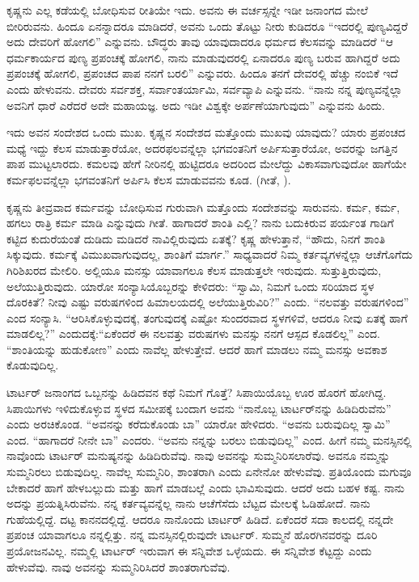 ಕೃಷ್ಣನು ಎಲ್ಲ ಕಡೆಯಲ್ಲಿ ಬೋಧಿಸುವ ರೀತಿಯೇ ಇದು. ಅವನು ಈ ವರ್ಚಸ್ಸನ್ನೇ ಇಡೀ ಜನಾಂಗದ ಮೇಲೆ ಬೀರಿರುವನು. ಹಿಂದೂ ಏನನ್ನಾದರೂ ಮಾಡಿದರೆ, ಅವನು ಒಂದು ತೊಟ್ಟು ನೀರು ಕುಡಿದರೂ “ಇದರಲ್ಲಿ ಪುಣ್ಯವಿದ್ದರೆ ಅದು ದೇವರಿಗೆ ಹೋಗಲಿ” ಎನ್ನುವನು. ಬೌದ್ಧರು ತಾವು ಯಾವುದಾದರೂ ಧರ್ಮದ ಕೆಲಸವನ್ನು ಮಾಡಿದರೆ “ಆ ಧರ್ಮಕಾರ್ಯದ ಪುಣ್ಯ ಪ್ರಪಂಚಕ್ಕೆ ಹೋಗಲಿ, ನಾನು ಮಾಡುವುದರಲ್ಲಿ ಏನಾದರೂ ಪುಣ್ಯ ಬರುವ ಹಾಗಿದ್ದರೆ ಅದು ಪ್ರಪಂಚಕ್ಕೆ ಹೋಗಲಿ, ಪ್ರಪಂಚದ ಪಾಪ ನನಗೆ ಬರಲಿ” ಎನ್ನುವರು. ಹಿಂದೂ ತನಗೆ ದೇವರಲ್ಲಿ ಹೆಚ್ಚು ನಂಬಿಕೆ ಇದೆ ಎಂದು ಹೇಳುವನು. ದೇವರು ಸರ್ವಶಕ್ತ, ಸರ್ವಾಂತರ್ಯಾಮಿ, ಸರ್ವವ್ಯಾಪಿ ಎನ್ನುವನು. “ನಾನು ನನ್ನ ಪುಣ್ಯವನ್ನೆಲ್ಲಾ ಅವನಿಗೆ ಧಾರೆ ಎರೆದರೆ ಅದೇ ಮಹಾಯಜ್ಞ. ಅದು ಇಡೀ ವಿಶ್ವಕ್ಕೇ ಅರ್ಪಣೆಯಾಗುವುದು” ಎನ್ನುವನು ಹಿಂದು.

ಇದು ಅವನ ಸಂದೇಶದ ಒಂದು ಮುಖ. ಕೃಷ್ಣನ ಸಂದೇಶದ ಮತ್ತೊಂದು ಮುಖವು ಯಾವುದು? ಯಾರು ಪ್ರಪಂಚದ ಮಧ್ಯೆ ಇದ್ದು ಕೆಲಸ ಮಾಡುತ್ತಾರೆಯೋ, ಅದರ\break ಫಲವನ್ನೆಲ್ಲಾ ಭಗವಂತನಿಗೆ ಅರ್ಪಿಸುತ್ತಾರೆಯೋ, ಅವರನ್ನು ಜಗತ್ತಿನ ಪಾಪ ಮುಟ್ಟಲಾರದು. ಕಮಲವು ಹೇಗೆ ನೀರಿನಲ್ಲಿ ಹುಟ್ಟಿದರೂ ಅದರಿಂದ ಮೇಲೆದ್ದು ವಿಕಾಸವಾಗುವುದೋ ಹಾಗೆಯೇ ಕರ್ಮಫಲವನ್ನೆಲ್ಲಾ ಭಗವಂತನಿಗೆ ಅರ್ಪಿಸಿ ಕೆಲಸ ಮಾಡುವವನು ಕೂಡ. (ಗೀತೆ, ).

ಕೃಷ್ಣನು ತೀವ್ರವಾದ ಕರ್ಮವನ್ನು ಬೋಧಿಸುವ ಗುರುವಾಗಿ ಮತ್ತೊಂದು ಸಂದೇಶವನ್ನು ಸಾರುವನು. ಕರ್ಮ, ಕರ್ಮ, ಹಗಲು ರಾತ್ರಿ ಕರ್ಮ ಮಾಡಿ ಎನ್ನುವುದು ಗೀತೆ. ಹಾಗಾದರೆ ಶಾಂತಿ ಎಲ್ಲಿ? ನಾನು ಬದುಕಿರುವ ಪರ್ಯಂತ ಗಾಡಿಗೆ ಕಟ್ಟಿದ ಕುದುರೆಯಂತೆ ದುಡಿದು ಮಡಿದರೆ ನಾವಿಲ್ಲಿರುವುದು ಏತಕ್ಕೆ? ಕೃಷ್ಣ ಹೇಳುತ್ತಾನೆ, “ಹೌದು, ನಿನಗೆ ಶಾಂತಿ ಸಿಕ್ಕುವುದು. ಕರ್ಮಕ್ಕೆ ವಿಮುಖವಾಗುವುದಲ್ಲ, ಶಾಂತಿಗೆ ಮಾರ್ಗ.” ಸಾಧ್ಯವಾದರೆ ನಿಮ್ಮ ಕರ್ತವ್ಯಗಳನ್ನೆಲ್ಲಾ ಆಚೆಗೊಗೆದು ಗಿರಿಶಿಖರದ ಮೇಲಿರಿ. ಅಲ್ಲಿಯೂ ಮನಸ್ಸು ಯಾವಾಗಲೂ ಕೆಲಸ ಮಾಡುತ್ತಲೇ ಇರುವುದು. ಸುತ್ತುತ್ತಿರುವುದು, ಅಲೆಯುತ್ತಿರುವುದು. ಯಾರೋ ಸಂನ್ಯಾಸಿಯೊಬ್ಬರನ್ನು ಕೇಳಿದರು: “ಸ್ವಾಮಿ, ನಿಮಗೆ ಒಂದು ಸರಿಯಾದ ಸ್ಥಳ ದೊರಕಿತೆ? ನೀವು ಎಷ್ಟು ವರುಷಗಳಿಂದ ಹಿಮಾಲಯದಲ್ಲಿ ಅಲೆಯುತ್ತಿರುವಿರಿ?” ಎಂದು. “ನಲವತ್ತು ವರುಷಗಳಿಂದ” ಎಂದ ಸಂನ್ಯಾಸಿ. “ಆರಿಸಿಕೊಳ್ಳುವುದಕ್ಕೆ, ತಂಗುವುದಕ್ಕೆ ಎಷ್ಟೋ ಸುಂದರವಾದ ಸ್ಥಳಗಳಿವೆ, ಆದರೂ ನೀವು ಏತಕ್ಕೆ ಹಾಗೆ ಮಾಡಲಿಲ್ಲ?” ಎಂದುದಕ್ಕೆ:\break “ಏಕೆಂದರೆ ಈ ನಲವತ್ತು ವರುಷಗಳು ಮನಸ್ಸು ನನಗೆ ಆಸ್ಪದ ಕೊಡಲಿಲ್ಲ” ಎಂದ. “ಶಾಂತಿಯನ್ನು ಹುಡುಕೋಣ” ಎಂದು ನಾವೆಲ್ಲ ಹೇಳುತ್ತೇವೆ. ಆದರೆ ಹಾಗೆ ಮಾಡಲು ನಮ್ಮ ಮನಸ್ಸು ಅವಕಾಶ ಕೊಡುವುದಿಲ್ಲ.

ಟಾರ್ಟರ್​ ಜನಾಂಗದ ಒಬ್ಬನನ್ನು ಹಿಡಿದವನ ಕಥೆ ನಿಮಗೆ ಗೊತ್ತೆ? ಸಿಪಾಯಿಯೊಬ್ಬ ಊರ ಹೊರಗೆ ಹೋಗಿದ್ದ. ಸಿಪಾಯಿಗಳು ಇಳಿದುಕೊಳ್ಳುವ ಸ್ಥಳದ ಸಮೀಪಕ್ಕೆ ಬಂದಾಗ ಅವನು “ನಾನೊಬ್ಬ ಟಾರ್ಟರ್​ನನ್ನು ಹಿಡಿದಿರುವೆನು” ಎಂದು ಅರಚಿಕೊಂಡ. “ಅವನನ್ನು ಕರೆದುಕೊಂಡು ಬಾ” ಯಾರೋ ಹೇಳಿದರು. “ಅವನು ಬರುವುದಿಲ್ಲ ಸ್ವಾಮಿ” ಎಂದ. “ಹಾಗಾದರೆ ನೀನೇ ಬಾ” ಎಂದರು. “ಅವನು ನನ್ನನ್ನು ಬರಲು ಬಿಡುವುದಿಲ್ಲ” ಎಂದ. ಹೀಗೆ ನಮ್ಮ ಮನಸ್ಸಿನಲ್ಲಿ ನಾವೊಂದು ಟಾರ್ಟರ್​ ಮನುಷ್ಯನನ್ನು ಹಿಡಿದಿರುವೆವು. ನಾವು ಅವನನ್ನು ಸುಮ್ಮನಿರಿಸಲಾರೆವು. ಅವನೂ ನಮ್ಮನ್ನು ಸುಮ್ಮನಿರಲು ಬಿಡುವುದಿಲ್ಲ. ನಾವೆಲ್ಲ ಸುಮ್ಮನಿರಿ, ಶಾಂತರಾಗಿ ಎಂದು ಏನೇನೋ ಹೇಳುವೆವು. ಪ್ರತಿಯೊಂದು ಮಗುವೂ ಬೇಕಾದರೆ ಹಾಗೆ ಹೇಳಬಲ್ಲುದು ಮತ್ತು ಹಾಗೆ ಮಾಡಬಲ್ಲೆ ಎಂದು ಭಾವಿಸುವುದು. ಆದರೆ ಅದು ಬಹಳ ಕಷ್ಟ. ನಾನು ಅದನ್ನು ಪ್ರಯತ್ನಿಸಿರುವೆನು. ನನ್ನ ಕರ್ತವ್ಯವನ್ನೆಲ್ಲ ನಾನು ಆಚೆಗೆಸೆದು ಬೆಟ್ಟದ ಮೇಲಕ್ಕೆ ಓಡಿಹೋದೆ. ನಾನು ಗುಹೆಯಲ್ಲಿದ್ದೆ. ದಟ್ಟ ಕಾನನದಲ್ಲಿದ್ದೆ. ಆದರೂ ನಾನೊಂದು ಟಾರ್ಟರ್​ ಹಿಡಿದೆ. ಏಕೆಂದರೆ ಸದಾ ಕಾಲದಲ್ಲಿ ನನ್ನದೇ ಪ್ರಪಂಚ ಯಾವಾಗಲೂ ನನ್ನಲ್ಲಿತ್ತು. ನನ್ನ ಮನಸ್ಸಿನಲ್ಲಿರುವುದೇ ಟಾರ್ಟರ್​. ಸುಮ್ಮನೆ ಹೊರಗಿನವರನ್ನು ದೂರಿ ಪ್ರಯೋಜನವಿಲ್ಲ. ನಮ್ಮಲ್ಲಿ ಟಾರ್ಟರ್​ ಇರುವಾಗ ಈ ಸನ್ನಿವೇಶ ಒಳ್ಳೆಯದು. ಈ ಸನ್ನಿವೇಶ ಕೆಟ್ಟದ್ದು ಎಂದು ಹೇಳುವೆವು. ನಾವು ಅವನನ್ನು ಸುಮ್ಮನಿರಿಸಿದರೆ ಶಾಂತರಾಗುವೆವು.

